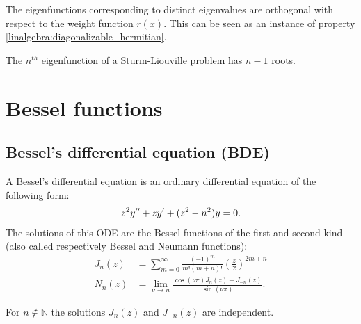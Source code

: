    \begin{property}
        The eigenfunctions corresponding to distinct eigenvalues are orthogonal with respect to the weight function $r(x)$. This can be seen as an instance of property \ref{linalgebra:diagonalizable_hermitian}.
    \end{property}

    \begin{theorem}
        The $n^{th}$ eigenfunction of a Sturm-Liouville problem has $n-1$ roots.
    \end{theorem}

\section{Bessel functions}
\subsection{Bessel's differential equation (BDE)}

    A Bessel's differential equation is an ordinary differential equation of the following form:
    \begin{gather}\index{Bessel!differential equation}
        \label{bessel:differential_equation}
        z^2y'' + zy' + (z^2 - n^2)y = 0.
    \end{gather}
    The solutions of this ODE are the Bessel functions of the first and second kind (also called respectively Bessel and Neumann functions):
    \begin{align}
        \label{bessel:bessel_function}
        J_n(z) &= \sum_{m = 0}^\infty\frac{(-1)^m}{m!(m + n)!}\left(\frac{z}{2}\right)^{2m + n}\\
        \label{bessel:neumann_function}
        N_n(z) &= \lim_{\nu\rightarrow n}\frac{\cos(\nu \pi)J_n(z) - J_{-n}(z)}{\sin(\nu\pi)}.
    \end{align}

    \begin{property}
        For $n\not\in\mathbb{N}$ the solutions $J_n(z)$ and $J_{-n}(z)$ are independent.
    \end{property}

